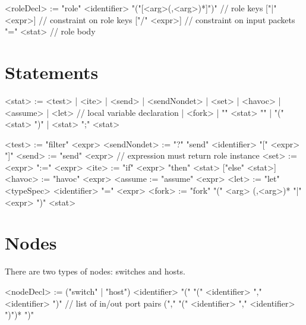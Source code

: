 \documentclass{report}
\begin{document}
\begin{bnflisting}{}
<roleDecl> := "role" <identifier> 
              "("[<arg>(,<arg>)*]")" // role keys
              ["|" <expr>]    // constraint on role keys
              ["/" <expr>]    // constraint on input packets
              "=" <stat>      // role body
\end{bnflisting}

\section{Statements}

\begin{bnflisting}{}
<stat> := <test> 
        | <ite>
        | <send>
        | <sendNondet>
        | <set>
        | <havoc>
        | <assume>
        | <let>           // local variable declaration
        | <fork>
        | "{" <stat> "}"
        | "(" <stat> ")"
        | <stat> ";" <stat>

<test>       := "filter" <expr>
<sendNondet> := "?" "send" <identifier> "[" <expr> "]"
<send>       := "send" <expr> // expression must return role instance
<set>        := <expr> ":=" <expr>
<ite>        := "if" <expr> "then" <stat> ["else" <stat>]
<havoc>      := "havoc" <expr>
<assume      := "assume" <expr>
<let>        := "let" <typeSpec> <identifier> "=" <expr>
<fork>       := "fork" "(" <arg> (,<arg>)* "|" <expr> ")" <stat>
\end{bnflisting}

\section{Nodes}

There are two types of nodes: switches and hosts.  

\begin{bnflisting}{}
<nodeDecl> := ("switch" | "host") <identifier> "(" 
              "(" <identifier> "," <identifier> ")" // list of in/out port pairs
              ("," "(" <identifier> "," <identifier> ")")*
              ")"
\end{bnflisting}
\end{document}
